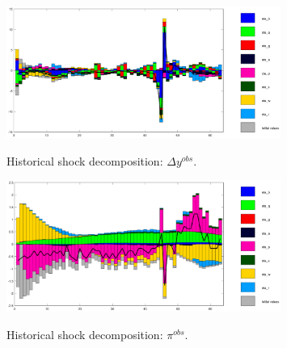  
\begin{figure}[H]
\centering 
\includegraphics[width=0.8\textwidth]{EA_SWW14_rep/graphs/EA_SWW14_rep_shock_decomposition_dy_obs}
\label{Fig:shock_decomp:dy_obs}
\caption{Historical shock decomposition: $ {\Delta y^{obs}} $.}
\end{figure}
 
\begin{figure}[H]
\centering 
\includegraphics[width=0.8\textwidth]{EA_SWW14_rep/graphs/EA_SWW14_rep_shock_decomposition_pi_obs}
\label{Fig:shock_decomp:pi_obs}
\caption{Historical shock decomposition: $ {\pi^{obs}} $.}
\end{figure}
 
 
